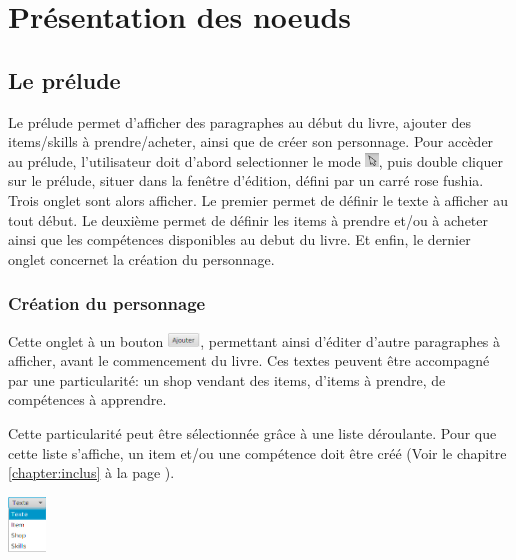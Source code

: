 \chapter{Présentation des noeuds}\label{chapter:noeuds}

	\section{Le prélude}
        Le prélude permet d'afficher des paragraphes au début du livre, ajouter des items/skills à prendre/acheter, ainsi que de créer son personnage. Pour accèder au prélude, l'utilisateur doit d'abord selectionner le mode \includegraphics[height=10pt]{img/modeSelected.png}, puis double cliquer sur le prélude, situer dans la fenêtre d'édition, défini par un carré rose fushia.
		Trois onglet sont alors afficher. Le premier permet de définir le texte à afficher au tout début. Le deuxième permet de définir les items à prendre et/ou à acheter ainsi que les compétences disponibles au debut du livre. Et enfin, le dernier onglet concernet la création du personnage.

		\subsection{Création du personnage}
			Cette onglet à un bouton \includegraphics[height=10pt]{img/ajouterBouton.png}, permettant ainsi d'éditer d'autre paragraphes à afficher, avant le commencement du livre. Ces textes peuvent être accompagné par une particularité: un shop vendant des items, d'items à prendre, de compétences à apprendre.\\
			\newline
			\begin{minipage}{0.85\textwidth}
				Cette particularité peut être sélectionnée grâce à une liste déroulante. Pour que cette liste s'affiche, un item et/ou une compétence doit être créé (Voir le chapitre \ref{chapter:inclus} à la page \pageref{chapter:inclus}).\\
			\end{minipage}
			\hfill
			\begin{minipage}{1.5cm}
				\includegraphics[width=1cm]{img/preludeListeDeroulante.png}
			\end{minipage}


